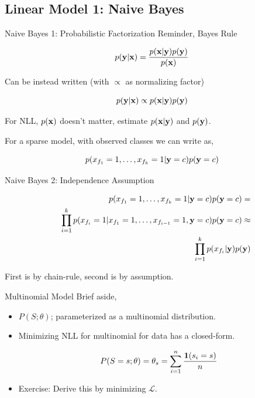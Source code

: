 \documentclass{beamer}
\begin{document}
\subsection{Linear Model 1: Naive Bayes}

\begin{frame}{Naive Bayes 1: Probabilistic Factorization} 
  Reminder, Bayes Rule

  \[ p(\mathbf{y} | \mathbf{x}) = \frac{p(\mathbf{x} | \mathbf{y}) p(\mathbf{y})}{p(\mathbf{x})} \] 

  Can be instead written (with $\propto$ as normalizing factor) 

  \[ p(\mathbf{y} | \mathbf{x}) \propto p(\mathbf{x} | \mathbf{y}) p(\mathbf{y}) \] 


  For NLL, $p(\mathbf{x})$ doesn't matter, estimate $p(\mathbf{x} | \mathbf{y})$ and $p(\mathbf{y})$.


  \air

  For a sparse model, with observed classes we can write as,
  
  \[p(x_{f_1}=1, \ldots, x_{f_k}=1 | \mathbf{y}=c ) p(\mathbf{y}=c)\]



\end{frame}


\begin{frame}{Naive Bayes 2: Independence Assumption} 

  \begin{eqnarray*}
    && p(x_{f_1}=1, \ldots, x_{f_k}=1 | \mathbf{y}=c ) p(\mathbf{y}=c) =\\
     && \prod_{i=1}^k p(x_{f_i}=1 | x_{f_1}=1, \ldots, x_{f_{i-1}}=1, \mathbf{y}=c) p(\mathbf{y}=c) \approx \\
     && \prod_{i=1}^k p(x_{f_i} | \mathbf{y}) p(\mathbf{y})  
  \end{eqnarray*}

  
  First is by chain-rule, second is by assumption.

\end{frame}



\begin{frame}{Multinomial Model} 
  Brief aside, 
  \begin{itemize}
  \item $P(S; \theta)$; parameterized as a multinomial distribution.

  \item Minimizing NLL for multinomial for data has a closed-form.

    \[ P(S=s; \theta) = \theta_s = \sum_{i=1}^n \frac{\mathbf{1}(s_i = s)}{n} \]


  \item Exercise: Derive this by minimizing $\mathcal{L}$. 

  \end{itemize}
\end{frame}
\end{document}

